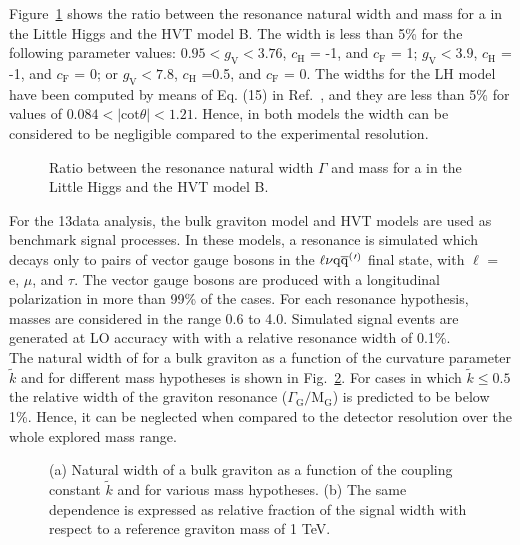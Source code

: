 Figure~\ref{fig:WHmodelsWidth} shows the ratio between the resonance natural width and mass for a \Wpr in the Little Higgs and the HVT model B.
The width is less than 5\% for the following parameter values:
$0.95 < g_\mathrm{V} < 3.76$, $c_\mathrm{H}$ = -1, and $c_\mathrm{F}$ = 1;
$g_\mathrm{V} < 3.9$, $c_\mathrm{H}$ = -1, and $c_\mathrm{F}$ = 0;
or $g_\mathrm{V} < 7.8$, $c_\mathrm{H}$ =0.5, and $c_\mathrm{F}$ = 0.
The widths for the LH model have been computed by means of Eq. (15) in Ref.~\cite{Burdman:2002ns}, and they are less than 5\%
for values of $0.084 < |\mathrm{cot}\theta| < 1.21$. Hence, in both models the width can be considered to be negligible compared to the experimental resolution.\\

\begin{figure}[!htb]
\centering
{}
\caption{Ratio between the resonance natural width $\Gamma$ and mass for a \Wpr in the Little Higgs and the HVT model B.}
\label{fig:WHmodelsWidth}
\end{figure}

For the 13\TeV data analysis, the bulk graviton model and HVT models are used as benchmark signal processes.
In these models, a resonance is simulated which decays only to pairs of vector gauge bosons in the $\ell\nu\mathrm{q}\overline{\mathrm{q}}^({}'^){}$ final state, with $\ell$ = e, $\mu$, and $\tau$.
The vector gauge bosons are produced with a longitudinal polarization in more than 99\% of the cases.
For each resonance hypothesis, masses are considered in the range 0.6 to 4.0\TeV.
Simulated signal events are generated at LO accuracy with \amcatnlo{} with a relative resonance width of 0.1\%.\\

The natural width of for a bulk graviton as a function of the curvature parameter $\tilde{k}$ and for different mass hypotheses is shown in Fig.~\ref{fig:bulkGwidth}.
For cases in which $\tilde{k} \leq 0.5$ the relative width of the graviton resonance ($\Gamma_\mathrm{G}/\mathrm{M}_\mathrm{G}$)
is predicted to be below 1\%. Hence, it can be neglected when compared to the detector resolution over the whole explored mass range.

\begin{figure}[!htb]
\centering
{}
\caption{(a) Natural width of a bulk graviton as a function of the coupling constant $\tilde{k}$ and for various mass hypotheses. (b) The same dependence is expressed as relative fraction of the signal width with respect to a reference graviton mass of 1 TeV.}
\label{fig:bulkGwidth}
\end{figure}

